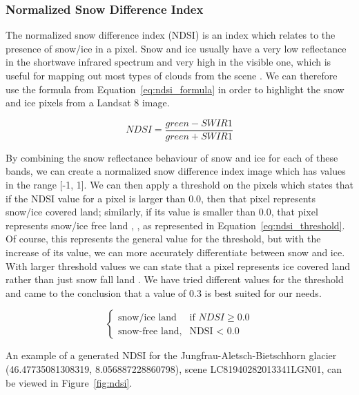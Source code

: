 \documentclass[12pt, a4paper]{report}
\begin{document}
	
	\subsubsection{Normalized Snow Difference Index}
	\label{seq:ndsi_functional}
	
	\par The normalized snow difference index (NDSI) is an index which relates to the presence of snow/ice in a pixel. Snow and ice usually have a very low reflectance in the shortwave infrared spectrum and very high in the visible one, which is useful for mapping out most types of clouds from the scene \cite{ndsi}. We can therefore use the formula from Equation~\ref{eq:ndsi_formula} in order to highlight the snow and ice pixels from a Landsat 8 image.
	
	\begin{equation}\label{eq:ndsi_formula}
		NDSI = \frac{green - SWIR1}{green + SWIR1}
	\end{equation}

	\par By combining the snow reflectance behaviour of snow and ice for each of these bands, we can create a normalized snow difference index image which has values in the range [-1, 1]. We can then apply a threshold on the pixels which states that if the NDSI value for a pixel is larger than 0.0, then that pixel represents snow/ice covered land; similarly, if its value is smaller than 0.0, that pixel represents snow/ice free land \cite{ndsi}, \cite{viirs}, as represented in Equation~\ref{eq:ndsi_threshold}. Of course, this represents the general value for the threshold, but with the increase of its value, we can more accurately differentiate between snow and ice. With larger threshold values we can state that a pixel represents ice covered land rather than just snow fall land \cite{viirs}. We have tried different values for the threshold and came to the conclusion that a value of 0.3 is best suited for our needs.
	
	\begin{equation}
		\begin{cases}\label{eq:ndsi_threshold}
			\text{snow/ice land} & \text{if } NDSI \geq 0.0\\
			\text{snow-free land}, & \text{NDSI < 0.0}
		\end{cases}
	\end{equation}

	\par An example of a generated NDSI for the Jungfrau-Aletsch-Bietschhorn glacier (46.47735081308319, 8.056887228860798), scene LC81940282013341LGN01, can be viewed in Figure~\ref{fig:ndsi}.
	
\end{document}
